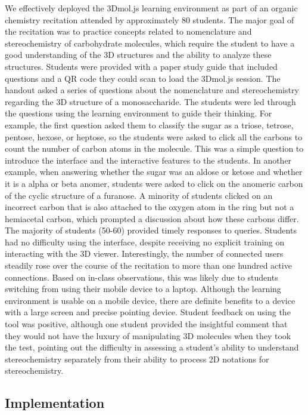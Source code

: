\documentclass[journal=jceda8,manuscript=article]{achemso}
\begin{document}
We effectively deployed the 3Dmol.js learning environment as part of an organic chemistry recitation attended by approximately 80 students. The major goal of the recitation was to practice concepts related to nomenclature and stereochemistry of carbohydrate molecules, which require the student to have a good understanding of the 3D structures and the ability to analyze these structures.  Students were provided with a paper study guide that included questions and a QR code they could scan to load the 3Dmol.js session.  The handout asked a series of questions about the nomenclature and stereochemistry regarding the 3D structure of a monosaccharide.  The students were led through the questions using the learning environment to guide their thinking.  For example, the first question asked them to classify the sugar as a triose, tetrose, pentose, hexose, or heptose, so the students were asked to click all the carbons to count the number of carbon atoms in the molecule.  This was a simple question to introduce the interface and the interactive features to the students.  In another example, when answering whether the sugar was an aldose or ketose and whether it is a alpha or beta anomer, students were asked to click on the anomeric carbon of the cyclic structure of a furanose.  A minority of students clicked on an incorrect carbon that is also attached to the oxygen atom in the ring but not a hemiacetal carbon, which prompted a discussion about how these carbons differ.  The majority of students (50-60) provided timely responses to queries.  Students had no difficulty using the interface, despite receiving no explicit training on interacting with the 3D viewer.  Interestingly, the number of connected users steadily rose over the course of the recitation to more than one hundred active connections.  Based on in-class observations, this was likely due to students switching from using their mobile device to a laptop.  Although the learning environment is usable on a mobile device, there are definite benefits to a device with a large screen and precise pointing device.  Student feedback on using the tool was positive, although one student provided the insightful comment that they would not have the luxury of manipulating 3D molecules when they took the test, pointing out the difficulty in assessing a student's ability to understand stereochemistry separately from their ability to process 2D notations for stereochemistry.



\subsection{Implementation}
\end{document}
